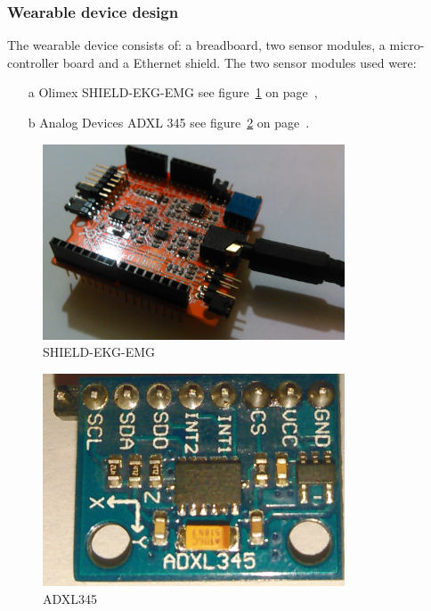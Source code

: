 \documentclass[12pt,]{article}
\numberwithin{figure}{section}
\begin{document}
\subsubsection{Wearable device design}
The wearable device consists of: a breadboard, two sensor modules, a micro-controller board and a Ethernet shield. The two sensor modules used were: 
\begin{itemize}
\item[a] Olimex SHIELD-EKG-EMG see figure~\ref{fig:14} on page~\pageref{fig:14},
\item[b] Analog Devices ADXL 345 see figure~\ref{fig:33} on page~\pageref{fig:33}.
\end{itemize}
\begin{figure}
	\begin{center}
		\includegraphics[width=0.8\textwidth]{13}
	\end{center}
    \caption{SHIELD-EKG-EMG}
	\label{fig:14}
\end{figure}
\begin{figure}
	\begin{center}
		\includegraphics[width=0.8\textwidth]{14}
	\end{center}
    \caption{ADXL345}
	\label{fig:33}
\end{figure}
\end{document}
